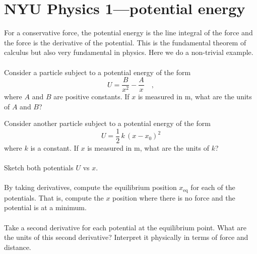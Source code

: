 \documentclass[12pt]{article}
\newcommand{\m}{\mathrm{m}}
\newcounter{problem}
\begin{document}
\sloppy\sloppypar\raggedbottom\frenchspacing\thispagestyle{empty}

\section*{NYU Physics 1---potential energy}

For a conservative force, the potential energy is the line integral of
the force and the force is the derivative of the potential.  This is
the fundamental theorem of calculus but also very fundamental in
physics.  Here we do a non-trivial example.

\paragraph{\theproblem}%
Consider a particle subject to a potential energy of the form
\begin{equation}
U = \frac{B}{x^2} - \frac{A}{x} \quad ,
\label{eq:hard}
\end{equation}
where $A$ and $B$ are positive constants.  If $x$ is measured in $\m$,
what are the units of $A$ and $B$?

Consider another particle subject to a potential energy of the form
\begin{equation}
U = \frac{1}{2}\,k\,(x-x_0)^2
\label{eq:easy}
\end{equation}
where $k$ is a constant.  If $x$ is measured in $\m$, what are
the units of $k$?

\paragraph{\theproblem}%
Sketch both potentials $U$ vs $x$.

\paragraph{\theproblem}%
By taking derivatives, compute the equilibrium position
$x_\mathrm{eq}$ for each of the potentials.  That is, compute the $x$
position where there is no force and the potential is at a minimum.

\paragraph{\theproblem}%
Take a second derivative for each potential at the equilibrium point.
What are the units of this second derivative?  Interpret it physically
in terms of force and distance.
\end{document}

